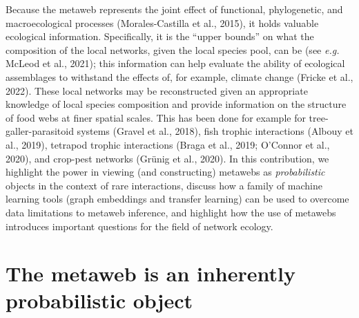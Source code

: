 \documentclass[11pt]{article}
\begin{document}
Because the metaweb represents the joint effect of functional,
phylogenetic, and macroecological processes (Morales-Castilla et al.,
2015), it holds valuable ecological information. Specifically, it is the
``upper bounds'' on what the composition of the local networks, given
the local species pool, can be (see \emph{e.g.} McLeod et al., 2021);
this information can help evaluate the ability of ecological assemblages
to withstand the effects of, for example, climate change (Fricke et al.,
2022). These local networks may be reconstructed given an appropriate
knowledge of local species composition and provide information on the
structure of food webs at finer spatial scales. This has been done for
example for tree-galler-parasitoid systems (Gravel et al., 2018), fish
trophic interactions (Albouy et al., 2019), tetrapod trophic
interactions (Braga et al., 2019; O'Connor et al., 2020), and crop-pest
networks (Grünig et al., 2020). In this contribution, we highlight the
power in viewing (and constructing) metawebs as \emph{probabilistic}
objects in the context of rare interactions, discuss how a family of
machine learning tools (graph embeddings and transfer learning) can be
used to overcome data limitations to metaweb inference, and highlight
how the use of metawebs introduces important questions for the field of
network ecology.

\hypertarget{the-metaweb-is-an-inherently-probabilistic-object}{%
\section{The metaweb is an inherently probabilistic
object}\label{the-metaweb-is-an-inherently-probabilistic-object}}
\end{document}
